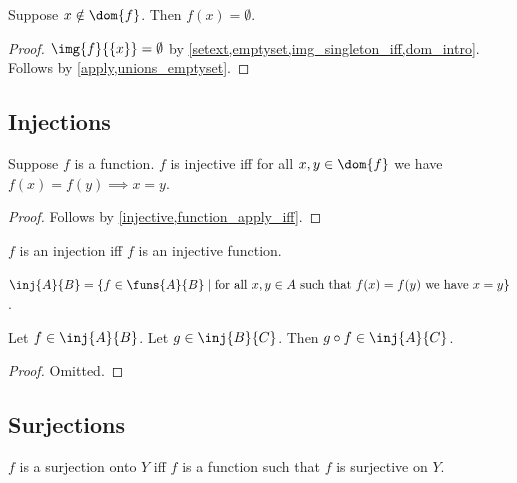 \begin{proposition}\label{function_apply_default}
    Suppose $x\notin\dom{f}$.
    Then $f(x) = \emptyset$.
\end{proposition}
\begin{proof}
    $\img{f}{\{x\}} = \emptyset$ by \cref{setext,emptyset,img_singleton_iff,dom_intro}.
    Follows by \cref{apply,unions_emptyset}.
\end{proof}



\subsection{Injections}

\begin{proposition}\label{injective_function}
    Suppose $f$ is a function.
    $f$ is injective iff for all $x,y\in\dom{f}$ we have $f(x) = f(y) \implies x = y$.
\end{proposition}
\begin{proof}
    Follows by \cref{injective,function_apply_iff}.
\end{proof}

\begin{abbreviation}\label{injection}
    $f$ is an injection iff $f$ is an injective function.
\end{abbreviation}

\begin{definition}\label{inj}
    $\inj{A}{B} = \{f\in\funs{A}{B}\mid \text{for all $x,y\in A$ such that $f(x)=f(y)$ we have $x = y$}\}$.
\end{definition}

\begin{proposition}\label{inj_circ}
    Let $f\in\inj{A}{B}$.
    Let $g\in\inj{B}{C}$.
    Then $g\circ f\in\inj{A}{C}$.
\end{proposition}
\begin{proof}
    Omitted. %
\end{proof}

\subsection{Surjections}

\begin{abbreviation}\label{surjection}
    $f$ is a surjection onto $Y$ iff $f$ is a function such that $f$ is surjective on $Y$.
\end{abbreviation}

